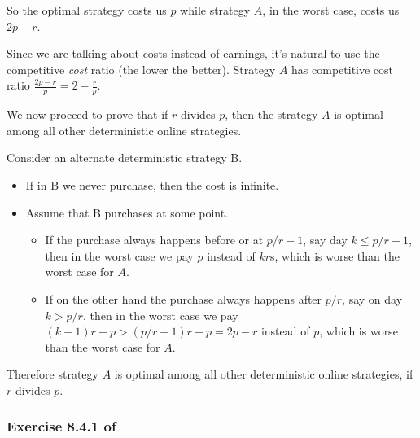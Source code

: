 \documentclass{article}
\begin{document}
So the optimal strategy costs us \(p\) while strategy \(A\),
in the worst case, costs us \(2p - r\).

Since we are talking about costs instead of earnings,
it's natural to use the competitive \emph{cost} ratio (the lower the better).
Strategy \(A\) has competitive cost ratio  \(\frac{2p - r}{p} = 2 - \frac{r}{p}\).

We now proceed to prove that
if \(r\) divides \(p\), then the strategy \(A\) is optimal
among all other deterministic online strategies.

Consider an alternate deterministic strategy B.
\begin{itemize}
    \item If in B we never purchase,
        then the cost is infinite.
    \item Assume that B purchases at some point.
        \begin{itemize}
            \item If the purchase always happens before or at
                \(p/r - 1\), say day \(k \leq p/r - 1\),
                then in the worst case we pay
                \(p\) instead of \(kr\)s,
                which is worse than the worst case for \(A\).
            \item If on the other hand the purchase always happens after
                \(p/r\), say on day \(k > p/r\),
                then in the worst case we pay
                \((k-1)r + p > (p/r - 1)r + p = 2p - r \) instead of \(p\),
                which is worse than the worst case for \(A\).
        \end{itemize}
\end{itemize}

Therefore strategy \(A\) is optimal among all other deterministic online strategies,
if \(r\) divides \(p\).



\subsubsection*{Exercise 8.4.1 of \cite{mmds}}





\end{document}
